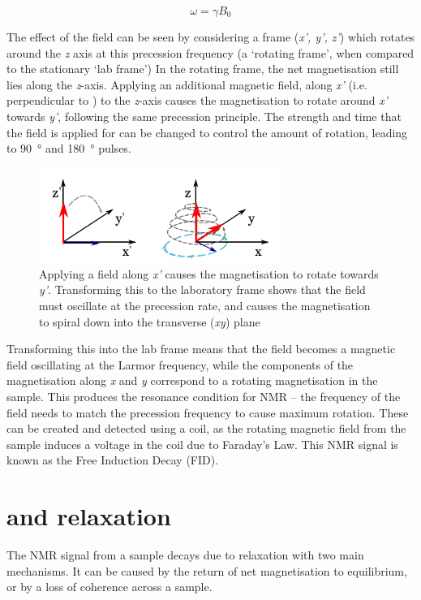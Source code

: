 \begin{equation}
\omega = \gamma B_0
\label{eq:back-larmor}
\end{equation}

The effect of the \Bone field can be seen by considering a frame (\textit{x', y', z'}) which rotates around the \textit{z} axis at this precession frequency (a `rotating frame', when compared to the stationary `lab frame')
In the rotating frame, the net magnetisation still lies along the \textit{z}-axis.
Applying an additional magnetic field, along \textit{x'} (i.e. perpendicular to \Bzero) to the \textit{z}-axis causes the magnetisation to rotate around \textit{x'} towards \textit{y'}, following the same precession principle.
The strength and time that the \Bone field is applied for can be changed to control the amount of rotation, leading to \SI{90}{\degree} and \SI{180}{\degree} pulses.

\begin{figure}[t]
\centering
\includegraphics[width=0.7\textwidth]{figures/background/fid.pdf}
\caption[Effect of the \Bone field]{Applying a \Bone field along \textit{x'} causes the magnetisation to rotate towards \textit{y'}. Transforming this to the laboratory frame shows that the \Bone field must oscillate at the precession rate, and causes the magnetisation to spiral down into the transverse (\textit{xy}) plane}
\label{fig:back-fid}
\end{figure}

Transforming this into the lab frame means that the \Bone field becomes a magnetic field oscillating at the Larmor frequency,
while the components of the magnetisation along \textit{x} and \textit{y} correspond to a rotating magnetisation in the sample.
This produces the resonance condition for NMR -- the frequency of the \Bone field needs to match the precession frequency to cause maximum rotation.
These can be created and detected using a coil, as the rotating magnetic field from the sample induces a voltage in the coil due to Faraday's Law.
This NMR signal is known as the Free Induction Decay (FID).

\section{\Tone and \Ttwo relaxation}
The NMR signal from a sample decays due to relaxation with two main mechanisms.
It can be caused by the return of net magnetisation to equilibrium, or by a loss of coherence across a sample.

